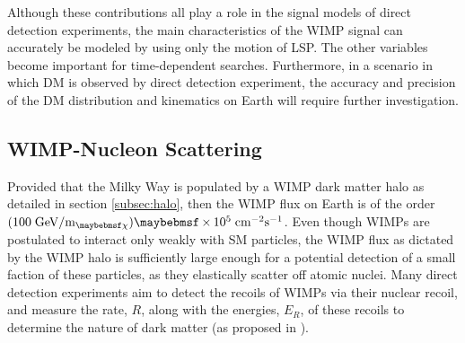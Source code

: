 Although these contributions all play a role in the signal models of direct detection experiments, the main characteristics of the WIMP signal can accurately be modeled by using only the motion of LSP. The other variables become important for time-dependent searches. Furthermore, in a scenario in which DM is observed by direct detection experiment, the accuracy and precision of the DM distribution and kinematics on Earth will require further investigation. 


\subsection{WIMP-Nucleon Scattering}
\label{subsec:scattering}

Provided that the Milky Way is populated by a WIMP dark matter halo as detailed in section \ref{subsec:halo}, then the WIMP flux on Earth is of the order $(100 \; \MathText{GeV}/\MathText{m}_{\chi}) \times 10^5  \; \MathText{cm}^{-2} \MathText{s}^{-1}$. Even though WIMPs are postulated to interact only weakly with SM particles, the WIMP flux as dictated by the WIMP halo is sufficiently large enough for a potential detection of a small faction of these particles, as they elastically scatter off atomic nuclei. Many direct detection experiments aim to detect the recoils of WIMPs via their nuclear recoil, and measure the rate, $R$, along with the energies, $E_{R}$, of these recoils to determine the nature of dark matter (as proposed in  \cite{Detectability_of_dm}).


